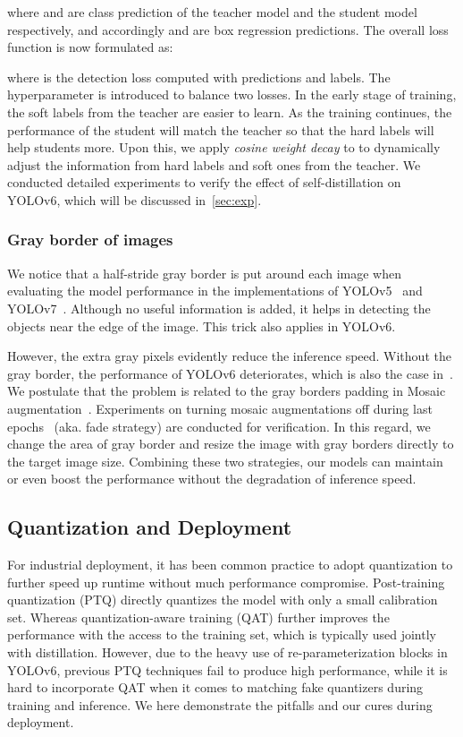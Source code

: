 \documentclass[10pt,twocolumn,letterpaper]{article}
\begin{document}
 where  and  are class prediction of the teacher model and the student model respectively, and accordingly  and  are box regression predictions. The overall loss function is now formulated as:
 
 where  is the detection loss computed with predictions and labels. The hyperparameter  is introduced to balance two losses. In the early stage of training, the soft labels from the teacher are easier to learn. As the training continues, the performance of the student will match the teacher so that the hard labels will help students more. Upon this, we apply \emph{cosine weight decay} to  to dynamically adjust the information from hard labels and soft ones from the teacher. We conducted detailed experiments to verify the effect of self-distillation on YOLOv6, which will be discussed in~\cref{sec:exp}.
 


 \subsubsection{Gray border of images}
 \label{sec:method:further:gray}
 We notice that a half-stride gray border is put around each image when evaluating the model performance in the implementations of YOLOv5~\cite{yolov5} and YOLOv7~\cite{wang2022yolov7}. Although no useful information is added, it helps in detecting the objects near the edge of the image. This trick also applies in  YOLOv6. 
 
 However, the extra gray pixels evidently reduce the inference speed. Without the gray border, the performance of YOLOv6 deteriorates, which is also the case in~\cite{yolov5,wang2022yolov7}. We postulate that the problem is related to the gray borders padding in Mosaic augmentation~\cite{bochkovskiy2020yolov4,yolov5}. Experiments on turning mosaic augmentations off during last epochs~\cite{ge2021yolox} (aka. fade strategy) are conducted for verification. In this regard, we change the area of gray border and resize the image with gray borders directly to the target image size. Combining these two strategies, our models can maintain or even boost the performance without the degradation of inference speed.


\subsection{Quantization and Deployment}\label{sec:quant-deploy}
For industrial deployment, it has been common practice to adopt quantization to further speed up runtime without much performance compromise. Post-training quantization (PTQ) directly quantizes the model with only a small calibration set. Whereas quantization-aware training (QAT) further improves the performance with the access to the training set, which is typically used jointly with distillation. However, due to the heavy use of re-parameterization blocks in YOLOv6, previous PTQ techniques fail to produce high performance, while it is hard to incorporate QAT when it comes to matching fake quantizers during training and inference. We here demonstrate the pitfalls and our cures during deployment.
\end{document}
